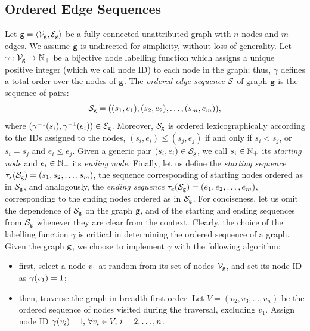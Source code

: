 \subsection{Ordered Edge Sequences}
Let $\Graph{g} = \Tuple{\Nodes{g}, \Edges{g}}$ be a fully connected unattributed graph with $n$ nodes and $m$ edges. We assume $\mathtt{g}$ is undirected for simplicity, without loss of generality. Let $\gamma: \Nodes{g} \shortrightarrow \Natural_{+}$ be a bijective node labelling function which assigns a unique positive integer (which we call node ID) to each node in the graph; thus, $\gamma$ defines a total order over the nodes of $\mathtt{g}$. The \emph{ordered edge sequence} $\Cal{S}$ of graph $\mathtt{g}$ is the sequence of pairs:
$$\OES{S}_{\Graph{g}} = ((s_1, e_1), (s_2, e_2), \ldots, (s_m, e_m)),$$
where $(\gamma^{-1}(s_i), \gamma^{-1}(e_i)) \in \Edges{g}$. Moreover, $\OES{S}_{\Graph{g}}$ is ordered lexicographically according to the IDs assigned to the nodes, \ie $(s_i,e_i) \leq (s_j,e_j)$ if and only if $s_i < s_j$, or $s_i = s_j$ and $e_i \leq e_j$. Given a generic pair $(s_i,e_i) \in \OES{S}_{\Graph{g}}$, we call $s_i \in \mathbb{N}_{+}$ its \emph{starting node} and $e_i \in \mathbb{N}_{+}$ its \emph{ending node}. Finally, let us define the \emph{starting sequence} $\Start{\OES{S}_{\Graph{g}}} = (s_1, s_2, \ldots, s_m)$, the sequence corresponding of starting nodes ordered as in $\OES{S}_{\Graph{g}}$, and analogously, the \emph{ending sequence} $\End{\OES{S}_{\Graph{g}}} = (e_1, e_2, \ldots, e_m)$, corresponding to the ending nodes ordered as in $\OES{S}_{\Graph{g}}$. For conciseness, let us omit the dependence of $\OES{S}_{\Graph{g}}$ on the graph $\mathtt{g}$, and of the starting and ending sequences from $\OES{S}_{\Graph{g}}$ whenever they are clear from the context. Clearly, the choice of the labelling function $\gamma$ is critical in determining the ordered sequence of a graph. Given the graph $\mathtt{g}$, we choose to implement $\gamma$ with the following algorithm:
\begin{itemize}
    \item first, select a node $v_1$ at random from its set of nodes $\Nodes{g}$, and set its node ID as $\gamma(v_1) = \mathsf{1}$;
    \item then, traverse the graph in breadth-first order. Let $V = (v_2, v_3, \ldots, v_{n})$ be the ordered sequence of nodes visited during the traversal, excluding $v_1$. Assign node ID $\gamma(v_i) = \mathsf{i},\, \forall v_i \in V,\, i=2, \ldots, n$.
\end{itemize}
